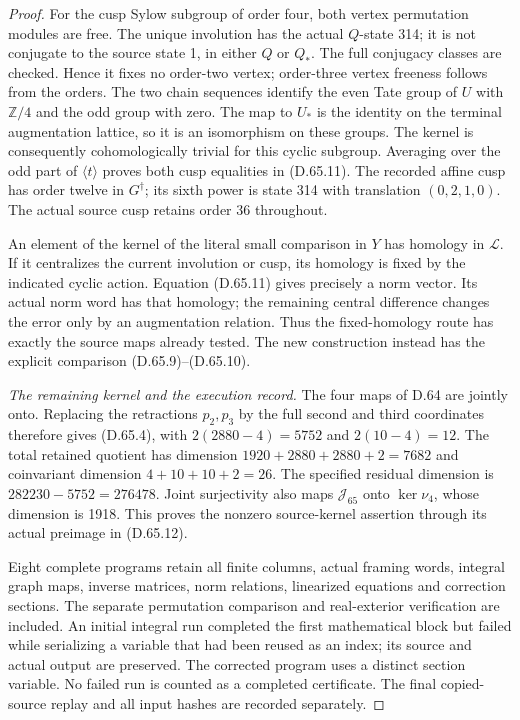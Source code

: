\begin{proof}
For the cusp Sylow subgroup of order four, both vertex permutation
modules are free. The unique involution has the actual \(Q\)-state
314; it is not conjugate to the source state 1, in either \(Q\) or
\(Q_*\). The full conjugacy classes are checked. Hence it fixes no
order-two vertex; order-three vertex freeness follows from the
orders. The two chain sequences identify the even Tate group of
\(U\) with \(\mathbb Z/4\) and the odd group with zero. The map to
\(U_*\) is the identity on the terminal augmentation lattice, so
it is an isomorphism on these groups. The kernel is consequently
cohomologically trivial for this cyclic subgroup. Averaging over
the odd part of \(\langle t\rangle\) proves both cusp equalities
in (D.65.11). The recorded affine cusp has order twelve in
\(G^\dagger\); its sixth power is state 314 with translation
\((0,2,1,0)\). The actual source cusp retains order 36 throughout.

An element of the kernel of the literal small comparison in \(Y\)
has homology in \(\mathcal L\). If it centralizes the current
involution or cusp, its homology is fixed by the indicated cyclic
action. Equation (D.65.11) gives precisely a norm vector. Its
actual norm word has that homology; the remaining central difference
changes the error only by an augmentation relation. Thus the
fixed-homology route has exactly the source maps already tested.
The new construction instead has the explicit comparison
(D.65.9)--(D.65.10).

\emph{The remaining kernel and the execution record.}
The four maps of D.64 are jointly onto. Replacing the retractions
\(p_2,p_3\) by the full second and third coordinates therefore
gives (D.65.4), with
\(2(2880-4)=5752\) and \(2(10-4)=12\).
The total retained quotient has dimension
\(1920+2880+2880+2=7682\) and coinvariant dimension
\(4+10+10+2=26\). The specified residual dimension is
\(282230-5752=276478\). Joint surjectivity also maps
\(\mathcal J_{65}\) onto \(\ker\nu_4\), whose dimension is 1918.
This proves the nonzero source-kernel assertion through its actual
preimage in (D.65.12).

Eight complete programs retain all finite columns, actual framing
words, integral graph maps, inverse matrices, norm relations,
linearized equations and correction sections. The separate
permutation comparison and real-exterior verification are included.
An initial integral run completed the first mathematical block but
failed while serializing a variable that had been reused as an
index; its source and actual output are preserved. The corrected
program uses a distinct section variable. No failed run is counted
as a completed certificate. The final copied-source replay and
all input hashes are recorded separately.
\end{proof}

